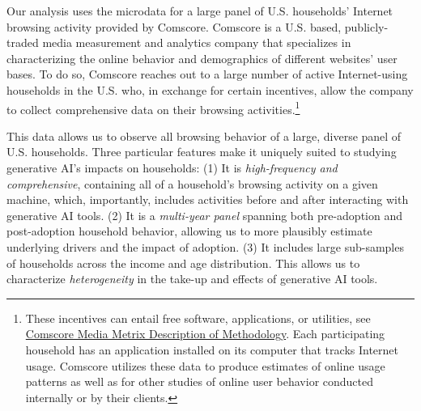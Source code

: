 \documentclass[12pt]{article}
\begin{document}
Our analysis uses the microdata for a large panel of U.S. households' Internet browsing activity provided by Comscore. Comscore is a U.S. based, publicly-traded media measurement and analytics company that specializes in characterizing the online behavior and demographics of different websites' user bases. To do so, Comscore reaches out to a large number of active Internet-using households in the U.S. who, in exchange for certain incentives, allow the company to collect comprehensive data on their browsing activities.\footnote{These incentives can entail free software, applications, or utilities, see \href{https://assets.pewresearch.org/wp-content/uploads/sites/13/2014/03/comScore-Media-Metrix-Description-of-Methodology.pdf}{Comscore Media Metrix Description of Methodology}. Each participating household has an application installed on its computer that tracks Internet usage. Comscore utilizes these data to produce estimates of online usage patterns as well as for other studies of online user behavior conducted internally or by their clients.}


This data allows us to observe all browsing behavior of a large, diverse panel of U.S. households. Three particular features make it uniquely suited to studying generative AI's impacts on households: (1) It is \textit{high-frequency and comprehensive}, containing all of a household's browsing activity on a given machine, which, importantly, includes activities before and after interacting with generative AI tools. (2) It is a \textit{multi-year panel} spanning both pre-adoption and post-adoption household behavior, allowing us to more plausibly estimate underlying drivers and the impact of adoption. (3) It includes large sub-samples of households across the income and age distribution. This allows us to characterize \textit{heterogeneity} in the take-up and effects of generative AI tools.
\end{document}
